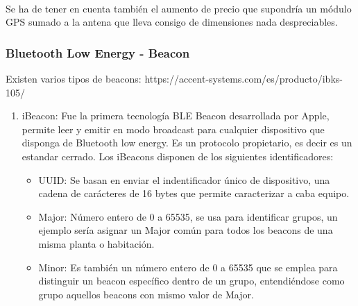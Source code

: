 \documentclass[a4paper ,12pt, onecolumn]{article}
\begin{document}
        \paragraph{}
        Se ha de tener en cuenta también el aumento de precio que supondría un módulo GPS sumado a la antena que lleva consigo de 
        dimensiones nada despreciables.
        \subsubsection {Bluetooth Low Energy - Beacon}
        Existen varios tipos de beacons:
        https://accent-systems.com/es/producto/ibks-105/
        \begin{enumerate}
            \item iBeacon: Fue la primera tecnología BLE Beacon desarrollada por Apple, permite leer y emitir en modo 
            broadcast para cualquier dispositivo que disponga de Bluetooth low energy. Es un protocolo propietario, es 
            decir es un estandar cerrado. 
            Los iBeacons disponen de los siguientes identificadores:
            \begin{itemize}
                \item UUID: Se basan en enviar el indentificador único de dispositivo, una cadena de
                carácteres de 16 bytes que permite caracterizar a caba equipo.
                \item Major: Número entero de 0 a 65535, se usa para identificar grupos, un ejemplo sería 
                asignar un Major común para todos los beacons de una misma planta o habitación.
                \item Minor: Es también un número entero de 0 a 65535 que se emplea para distinguir un beacon
                específico dentro de un grupo, entendiéndose como grupo aquellos beacons con mismo valor de Major.
            \end{itemize}

\end{enumerate}
\end{document}
